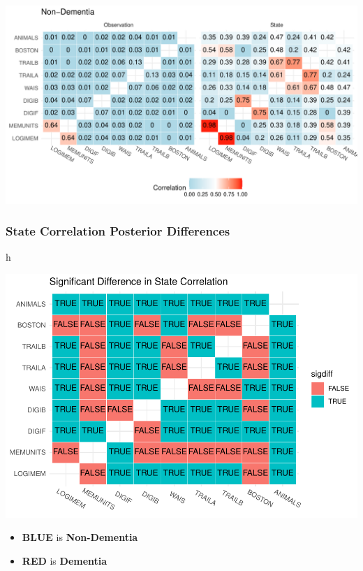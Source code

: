 \documentclass[
]{article}
\providecommand{\tightlist}{%
  \setlength{\itemsep}{0pt}\setlength{\parskip}{0pt}}
\begin{document}
\includegraphics{DataAnalysis_files/figure-latex/unnamed-chunk-5-1.pdf}

\hypertarget{state-correlation-posterior-differences}{%
\subsubsection{State Correlation Posterior Differences}\label{state-correlation-posterior-differences}}

h

\includegraphics{DataAnalysis_files/figure-latex/unnamed-chunk-7-1.pdf}

\begin{itemize}
\tightlist
\item
  \textbf{BLUE} is \textbf{Non-Dementia}
\item
  \textbf{RED} is \textbf{Dementia}
\end{itemize}
\end{document}
